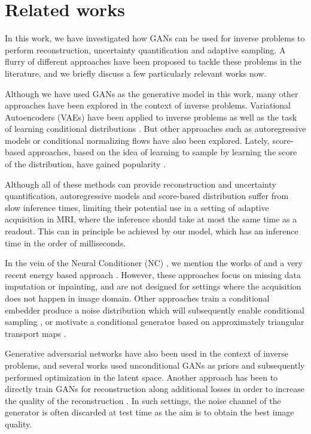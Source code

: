 \section{Related works}\label{ss:gans_rel}
In this work, we have investigated how GANs can be used for inverse problems to perform reconstruction, uncertainty quantification and adaptive sampling. A flurry of different approaches have been proposed to tackle these problems in the literature, and we briefly discuss a few particularly relevant works now.

Although we have used GANs as the generative model in this work, many other approaches have been explored in the context of inverse problems. Variational Autoencoders (VAEs) \citep{rezende2014stochastic,kingma2013auto} have been applied to inverse problems \citep{tonolini2019variational,zhang2021conditional} as well as the task of learning conditional distributions \citep{ivanov2018variational}. But other approaches such as autoregressive models 
\citep{oord2016conditional,van2016pixel} or conditional normalizing flows \citep{papamakarios2019normalizing,sun2020deep,denker2021conditional} have also been explored. Lately, score-based approaches, based on the idea of learning to sample by learning the score of the distribution, have gained popularity \citep{ramzi2020denoising,song2021solving}.

Although all of these methods can provide reconstruction and uncertainty quantification, autoregressive models and score-based distribution suffer from slow inference times, limiting their potential use in a setting of adaptive acquisition in MRI, where the inference should take at most the same time as a readout. This can in principle be achieved by our model, which has an inference time in the order of milliseconds. 

In the vein of the Neural Conditioner (NC) \citep{belghazi2019learning}, we mention the works of \citet{douglas2017universal,gautam2020masking} and a very recent energy based approach \citep{strauss2021arbitrary}. However, these approaches focus on missing data imputation or inpainting, and are not designed for settings where the acquisition does not happen in image domain. Other approaches train a conditional embedder produce a noise distribution which will subsequently enable conditional sampling \citep{whang2020approximate}, or motivate a conditional generator based on approximately triangular transport maps \citep{kovachki2020conditional}.

Generative adversarial networks have also been used in the context of inverse problems, and several works used unconditional GANs as priors \citep{bora2017compressed, anirudh2018unsupervised, latorre2019fast, narnhofer2019inverse,jalali2019solving, hussein2020image} and subsequently performed optimization in the latent space. Another approach has been to directly train GANs for reconstruction along additional losses in order to increase the quality of the reconstruction \citep{yang_dagan_2018}. In such settings, the noise channel of the generator is often discarded at test time as the aim is to obtain the best image quality.

